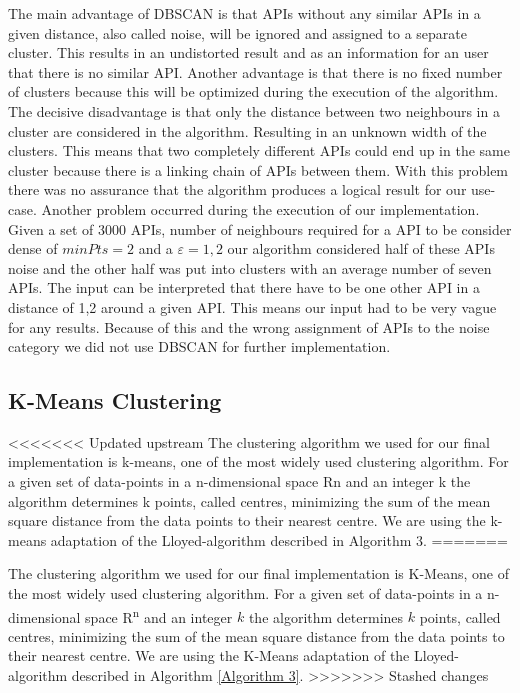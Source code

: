 \documentclass[a4paper]{IEEEtran}
\begin{document}
The main advantage of DBSCAN is that APIs without any similar APIs in a given distance, also called noise, will be ignored and assigned to a separate cluster. This results in an undistorted result and as an information for an user that there is no similar API. 
Another advantage is that there is no fixed number of clusters because this will be optimized during the execution of the algorithm.
The decisive disadvantage is that only the distance between two neighbours in a cluster are considered in the algorithm. Resulting in an unknown width of the clusters. This means that two completely different APIs could end up in the same cluster because there is a linking chain of APIs between them. With this problem there was no assurance that the algorithm produces a logical result for our use-case.
Another problem occurred during the execution of our implementation. Given a set of 3000 APIs, number of neighbours required for a API to be consider dense of $minPts = 2$ and a $ε = 1,2$ our algorithm considered half of these APIs noise and the other half was put into clusters with an average number of seven APIs. The input can be interpreted that there have to be one other API in a distance of 1,2 around a given API. This means our input had to be very vague for any results. Because of this and the wrong assignment of APIs to the noise category we did not use DBSCAN for further implementation.

\vspace{-12mm}

\subsection{K-Means Clustering}
<<<<<<< Updated upstream
The clustering algorithm we used for our final implementation is k-means, one of the most widely used clustering algorithm. For a given set of data-points in a n-dimensional space Rn and an integer k the algorithm determines k points, called centres, minimizing the sum of the mean square distance from the data points to their nearest centre. We are using the k-means adaptation of the Lloyed-algorithm described in Algorithm 3\cite{kanungo2002efficient}.
=======

The clustering algorithm we used for our final implementation is K-Means, one of the most widely used clustering algorithm. For a given set of data-points in a n-dimensional space R\textsuperscript{n} and an integer $k$ the algorithm determines $k$ points, called centres, minimizing the sum of the mean square distance from the data points to their nearest centre. We are using the K-Means adaptation of the Lloyed-algorithm described in Algorithm \ref{Algorithm 3}.
>>>>>>> Stashed changes
\end{document}
